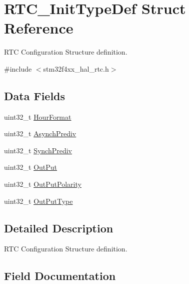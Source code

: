 \hypertarget{struct_r_t_c___init_type_def}{}\section{R\+T\+C\+\_\+\+Init\+Type\+Def Struct Reference}
\label{struct_r_t_c___init_type_def}


R\+TC Configuration Structure definition.  




{\ttfamily \#include $<$stm32f4xx\+\_\+hal\+\_\+rtc.\+h$>$}

\subsection*{Data Fields}
\begin{DoxyCompactItemize}
\item 
uint32\+\_\+t \hyperlink{struct_r_t_c___init_type_def_aa7dff3583cd79a5a3f9868a56ffd31ee}{Hour\+Format}
\item 
uint32\+\_\+t \hyperlink{struct_r_t_c___init_type_def_a8666a1fe64fe25f9b951219561a07a95}{Asynch\+Prediv}
\item 
uint32\+\_\+t \hyperlink{struct_r_t_c___init_type_def_ac27c42530b6ba86654ec476cd0d020fb}{Synch\+Prediv}
\item 
uint32\+\_\+t \hyperlink{struct_r_t_c___init_type_def_acd1593d55123feca6c3cae142134c294}{Out\+Put}
\item 
uint32\+\_\+t \hyperlink{struct_r_t_c___init_type_def_a14365da1f80863621341cf4a6a8d4e67}{Out\+Put\+Polarity}
\item 
uint32\+\_\+t \hyperlink{struct_r_t_c___init_type_def_a2c4a2bd3cfae39882e657e653e45185a}{Out\+Put\+Type}
\end{DoxyCompactItemize}


\subsection{Detailed Description}
R\+TC Configuration Structure definition. 

\subsection{Field Documentation}
\mbox{\label{struct_r_t_c___init_type_def_a8666a1fe64fe25f9b951219561a07a95}} 
